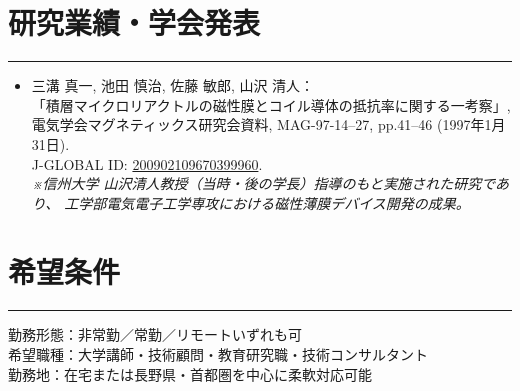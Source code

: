 \documentclass[lualatex,ja=standard,11pt]{bxjsarticle}
\newcommand{\cvsection}[1]{\section*{#1}\vspace{-0.3em}\hrule\vspace{0.5em}}
\begin{document}
\cvsection{研究業績・学会発表}
\begin{itemize}
  \item 三溝 真一, 池田 慎治, 佐藤 敏郎, 山沢 清人：\\
  「積層マイクロリアクトルの磁性膜とコイル導体の抵抗率に関する一考察」,\\
  電気学会マグネティックス研究会資料, MAG-97-14–27, pp.41–46 (1997年1月31日).\\
  J-GLOBAL ID: \href{https://jglobal.jst.go.jp/detail?JGLOBAL_ID=200902109670399960}{200902109670399960}.\\
  \textit{※信州大学 山沢清人教授（当時・後の学長）指導のもと実施された研究であり、
  工学部電気電子工学専攻における磁性薄膜デバイス開発の成果。}
\end{itemize}

\cvsection{希望条件}
勤務形態：非常勤／常勤／リモートいずれも可\\
希望職種：大学講師・技術顧問・教育研究職・技術コンサルタント\\
勤務地：在宅または長野県・首都圏を中心に柔軟対応可能
\end{document}
